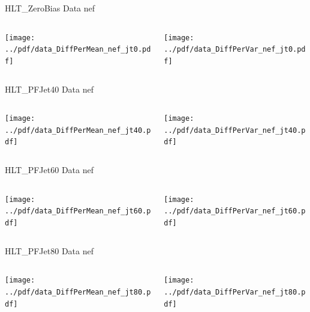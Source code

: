 \documentclass[9pt]{beamer}
\begin{document}
\begin{frame}[t]{HLT\_ZeroBias Data nef}
\begin{columns}[T]
  \begin{column}{.5\textwidth}
  \texttt{[image: ../pdf/data\_DiffPerMean\_nef\_jt0.pdf]}
  \end{column}
  \begin{column}{.5\textwidth}
  \texttt{[image: ../pdf/data\_DiffPerVar\_nef\_jt0.pdf]}
  \end{column}
\end{columns}
\end{frame}

\begin{frame}[t]{HLT\_PFJet40 Data nef}
\begin{columns}[T]
  \begin{column}{.5\textwidth}
  \texttt{[image: ../pdf/data\_DiffPerMean\_nef\_jt40.pdf]}
  \end{column}
  \begin{column}{.5\textwidth}
  \texttt{[image: ../pdf/data\_DiffPerVar\_nef\_jt40.pdf]}
  \end{column}
\end{columns}
\end{frame}

\begin{frame}[t]{HLT\_PFJet60 Data nef}
\begin{columns}[T]
  \begin{column}{.5\textwidth}
  \texttt{[image: ../pdf/data\_DiffPerMean\_nef\_jt60.pdf]}
  \end{column}
  \begin{column}{.5\textwidth}
  \texttt{[image: ../pdf/data\_DiffPerVar\_nef\_jt60.pdf]}
  \end{column}
\end{columns}
\end{frame}

\begin{frame}[t]{HLT\_PFJet80 Data nef}
\begin{columns}[T]
  \begin{column}{.5\textwidth}
  \texttt{[image: ../pdf/data\_DiffPerMean\_nef\_jt80.pdf]}
  \end{column}
  \begin{column}{.5\textwidth}
  \texttt{[image: ../pdf/data\_DiffPerVar\_nef\_jt80.pdf]}
  \end{column}
\end{columns}
\end{frame}
\end{document}
